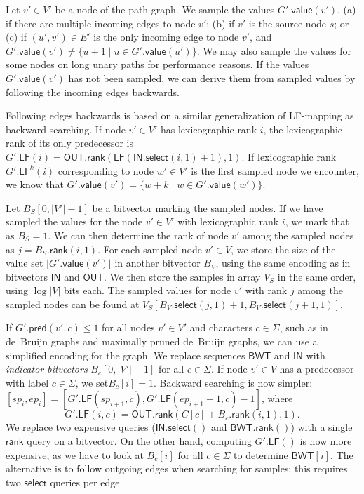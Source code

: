 \documentclass[a4paper,UKenglish]{lipics-v2016}
\newcommand{\set}[1]{\ensuremath{\{ #1 \}}}
\newcommand{\abs}[1]{\ensuremath{\lvert #1 \rvert}}
\newcommand{\rank}{\ensuremath{\mathsf{rank}}}
\newcommand{\select}{\ensuremath{\mathsf{select}}}
\newcommand{\LF}{\ensuremath{\mathsf{LF}}}
\newcommand{\gpred}{\ensuremath{\mathsf{pred}}}
\newcommand{\gvalue}{\ensuremath{\mathsf{value}}}
\newcommand{\LFmapping}{LF\nobreakdash-mapping}
\newcommand{\BWT}{\ensuremath{\mathsf{BWT}}}
\newcommand{\bvIN}{\ensuremath{\mathsf{IN}}}
\newcommand{\bvOUT}{\ensuremath{\mathsf{OUT}}}
\begin{document}
Let $v' \in V'$ be a node of the path graph. We sample the values $G'.\gvalue(v')$, (a) if there are multiple incoming edges to node $v'$; (b) if $v'$ is the source node $s$; or (c) if $(u', v') \in E'$ is the only incoming edge to node $v'$, and $G'.\gvalue(v') \ne \set{u+1 \mid u \in G'.\gvalue(u')}$. We may also sample the values for some nodes on long unary paths for performance reasons. If the values $G'.\gvalue(v')$ has not been sampled, we can derive them from sampled values by following the incoming edges backwards.

Following edges backwards is based on a similar generalization of \LFmapping{} as backward searching. If node $v' \in V'$ has lexicographic rank $i$, the lexicographic rank of its only predecessor is
$G'.\LF(i) = \bvOUT.\rank(\LF(\bvIN.\select(i, 1) + 1), 1)$. If lexicographic rank $G'.\LF^{k}(i)$ corresponding to node $w' \in V'$ is the first sampled node we encounter, we know that $G'.\gvalue(v') = \set{w+k \mid w \in G'.\gvalue(w')}$.

Let $B_{S}[0, \abs{V'}-1]$ be a bitvector marking the sampled nodes. If we have sampled the values for the node $v' \in V'$ with lexicographic rank $i$, we mark that as $B_{S} = 1$. We can then determine the rank of node $v'$ among the sampled nodes as $j = B_{S}.\rank(i, 1)$. For each sampled node $v' \in V$, we store the size of the value set $\abs{G'.\gvalue(v')}$ in another bitvector $B_{V}$, using the same encoding as in bitvectors $\bvIN$ and $\bvOUT$. We then store the samples in array $V_{S}$ in the same order, using $\log \abs{V}$ bits each. The sampled values for node $v'$ with rank $j$ among the sampled nodes can be found at $V_{S}[B_{V}.\select(j, 1) + 1, B_{V}.\select(j+1, 1)]$.

If $G'.\gpred(v', c) \le 1$ for all nodes $v' \in V'$ and characters $c \in \Sigma$, such as in de~Bruijn graphs and maximally pruned de~Bruijn graphs, we can use a simplified encoding for the graph. We replace sequences $\BWT$ and $\bvIN$ with \emph{indicator bitvectors} $B_{c}[0, \abs{V'}-1]$ for all $c \in \Sigma$. If node $v' \in V$ has a predecessor with label $c \in \Sigma$, we set$B_{c}[i] = 1$. Backward searching is now simpler: $[sp_{i}, ep_{i}] = [G'.\LF(sp_{i+1}, c), G'.\LF(ep_{i+1}+1, c) - 1]$, where
$$
G'.\LF(i, c) = \bvOUT.\rank(C[c] + B_{c}.\rank(i, 1), 1).
$$
We replace two expensive queries ($\bvIN.\select()$ and $\BWT.\rank()$) with a single $\rank$ query on a bitvector. On the other hand, computing $G'.\LF()$ is now more expensive, as we have to look at $B_{c}[i]$ for all $c \in \Sigma$ to determine $\BWT[i]$. The alternative is to follow outgoing edges when searching for samples; this requires two $\select$ queries per edge.
\end{document}
